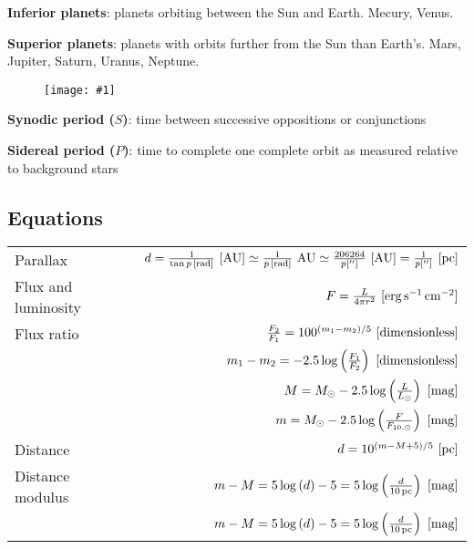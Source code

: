 \documentclass[a4paper,10pt]{article}
\newcommand{\fig}[1]{\centerline{\texttt{[image: \#1]}}}
\begin{document}
\textbf{Inferior planets}: planets orbiting between the Sun and Earth. Mecury, Venus.  

\textbf{Superior planets}: planets with orbits further from the Sun than Earth's. Mars, Jupiter, Saturn, Uranus, Neptune. 

\begin{figure}[h]
    \fig{orbital_configs}
\end{figure}


\textbf{Synodic period ($S$)}: time between successive oppositions or conjunctions 

\textbf{Sidereal period ($P$)}: time to complete one complete orbit as measured relative to background stars

\subsection{Equations}
\vspace{0.5cm}

\begin{tabularx}{\textwidth}{ l X r }
    Parallax && $d = \frac{1}{\tan p\,[{\rm rad}]}~[{\rm AU}] \simeq \frac{1}{p\,[{\rm rad}]}~{\rm AU} \simeq \frac{206264}{p['']}~[{\rm AU}] = \frac{1}{p['']}~[{\rm pc}]$ \\ 
    \addlinespace[0.5cm]
    Flux and luminosity && $F = \frac{L}{4\pi r^2}~[{\rm erg\,s^{-1}\,cm^{-2}}]$ \\
    \addlinespace[0.5cm]
    Flux ratio && $\frac{F_2}{F_1} = 100^{(m_1-m_2)/5}~[{\rm dimensionless}]$ \\
    \addlinespace[0.5cm]
               && $m_1 - m_2 = -2.5\log\left(\frac{F_1}{F_2}\right)~[{\rm dimensionless}]$ \\
    \addlinespace[0.5cm]
               && $M = M_\odot - 2.5\log\left(\frac{L}{L_\odot}\right)~[{\rm mag}]$ \\
    \addlinespace[0.5cm]
               && $m = M_\odot - 2.5\log\left(\frac{F}{F_{10, \odot}}\right)~[{\rm mag}]$ \\
    \addlinespace[0.5cm]
    Distance && $d = 10^{(m-M+5)/5}~[{\rm pc}]$ \\
    \addlinespace[0.5cm]
    Distance modulus && $m-M = 5\log\left(d\right)-5 = 5\log\left({\frac{d}{10\,{\rm pc}}}\right)~[{\rm mag}]$ \\ 
    \addlinespace[0.5cm]
                     && $m-M = 5\log\left(d\right)-5 = 5\log\left({\frac{d}{10\,{\rm pc}}}\right)~[{\rm mag}]$
\end{tabularx}
\end{document}
